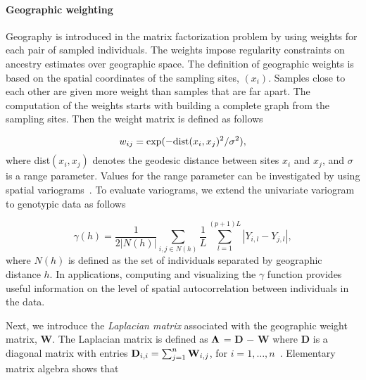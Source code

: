  \paragraph{Geographic weighting} Geography is introduced in the matrix factorization problem by using weights for each pair of sampled individuals. The weights impose regularity constraints on ancestry estimates over geographic space. The definition of geographic weights is based on the spatial coordinates of the sampling sites, $(x_i)$. Samples close to each other are given more weight than samples that are far apart. The computation of the weights starts with building a complete graph from the sampling sites. Then the weight matrix is defined as follows

$$
w_{ij} = \exp( - {\rm dist}( x_i, x_j )^2/ \sigma^2),
$$
\noindent where dist$( x_i, x_j )$ denotes the geodesic distance between sites $x_i$ and  $x_j$, and $\sigma$ is a range parameter. Values for the range parameter can be investigated by using spatial variograms~\citep{Cressie1993}. 
To evaluate variograms, we extend the univariate variogram to genotypic data as follows

\begin{equation}
\gamma(h) = \frac{1}{2 |N(h)|} \sum_{i,j \in N(h)} \frac{1}{L} \sum_{l = 1}^{(p+1)L} |Y_{i,l} - Y_{j,l}|,
\label{eq:gamma}
\end{equation}
\noindent where $N(h)$ is defined as the set of individuals separated by geographic distance $h$. 
In applications, computing and visualizing the $\gamma$ function  provides useful information on the level of spatial autocorrelation between individuals in the data. 


Next, we introduce the {\it Laplacian matrix} associated with the geographic weight matrix, {\bf W}. The Laplacian matrix is defined as ${\bf \Lambda}$ = {\bf D} $-$ {\bf W}  where  {\bf D} is a diagonal matrix with entries
${\bf D}_{i,i} = \sum_{j = 1}^n  {\bf W}_{i,j}$,  for  $i = 1, \dots, n$~\citep{Belkin2003}. Elementary matrix algebra shows that~\citep{DengCai2011}

